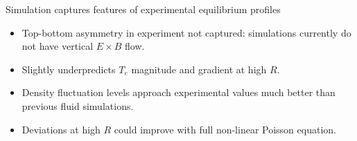\documentclass[12pt,table]{beamer}
\begin{document}
\begin{frame}{Simulation captures features of experimental equilibrium profiles}
\begin{minipage}{.5\linewidth}
\begin{itemize}
    \item Top-bottom asymmetry in experiment not captured: simulations currently do not have vertical $E\times B$ flow.
    \vspace{.7cm}
    \item Slightly underpredicts $T_e$ magnitude and gradient at high $R$.
    \vspace{1cm}
    \item Density fluctuation levels approach experimental values much better than previous fluid simulations.
    \item Deviations at high $R$ could improve with full non-linear Poisson equation.
\end{itemize}
\end{minipage}

\end{frame}
\end{document}
